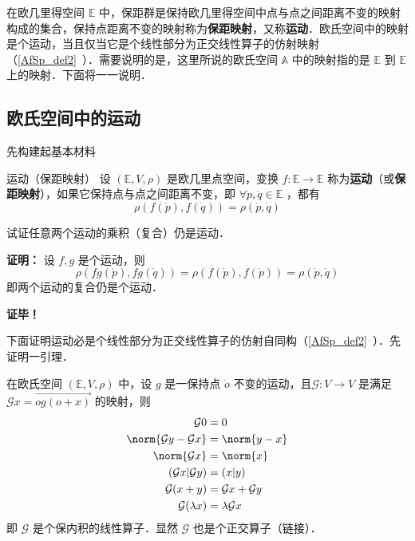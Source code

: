 
\begin{issues}
\end{issues}

在欧几里得空间 $\mathbb E$ 中，保距群是保持欧几里得空间中点与点之间距离不变的映射构成的集合，保持点距离不变的映射称为\textbf{保距映射}，又称\textbf{运动}．欧氏空间中的映射是个运动，当且仅当它是个线性部分为正交线性算子的仿射映射（\autoref{AfSp_def2}~）．需要说明的是，这里所说的欧氏空间 $\mathbb A$ 中的映射指的是 $\mathbb E$ 到 $\mathbb E$ 上的映射．下面将一一说明．
\subsection{欧氏空间中的运动}
先构建起基本材料
\begin{definition}{运动（保距映射）}
设 $(\mathbb E,V,\rho)$ 是欧几里点空间，变换 $f:\mathbb E\rightarrow\mathbb E$ 称为\textbf{运动}（或\textbf{保距映射}），如果它保持点与点之间距离不变，即 $\forall \dot p,\dot q\in\mathbb E$ ，都有
\begin{equation}
\rho(f(\dot p),f(\dot q))=\rho(\dot p,\dot q)
\end{equation}
\end{definition}
\begin{example}{}\label{CDQ2Ec_ex1}
试证任意两个运动的乘积（复合）仍是运动．

\textbf{证明：}
设 $f,g$ 是个运动，则
\begin{equation}
\rho(fg(\dot p),fg(\dot q))=\rho(f(\dot p),f(\dot p))=\rho(\dot p,\dot q)
\end{equation}
即两个运动的复合仍是个运动．

\textbf{证毕！}
\end{example}
下面证明运动必是个线性部分为正交线性算子的仿射自同构（\autoref{AfSp_def2}~）．先证明一引理．
\begin{lemma}{}\label{CDQ2Ec_lem1}
在欧氏空间 $(\mathbb E,V,\rho)$ 中，设 $g$ 是一保持点 $\dot o$ 不变的运动，且$\mathcal G:V\rightarrow V$ 是满足 $\mathcal G x=\overrightarrow{og(o+x)}$ 的映射，则
\begin{equation}
\begin{aligned}
\mathcal G 0&=0\\
\norm{\mathcal Gy-\mathcal Gx}&=\norm{y-x}\\
\norm{\mathcal G x}&=\norm{x}\\
(\mathcal G x|\mathcal G y)&=(x|y)\\
\mathcal G(x+y)&=\mathcal G x+\mathcal G y\\
\mathcal G(\lambda x)&=\lambda\mathcal G x
\end{aligned}
\end{equation}
即 $\mathcal G$ 是个保内积的线性算子．显然 $\mathcal G$ 也是个正交算子（链接）．
\end{lemma}
